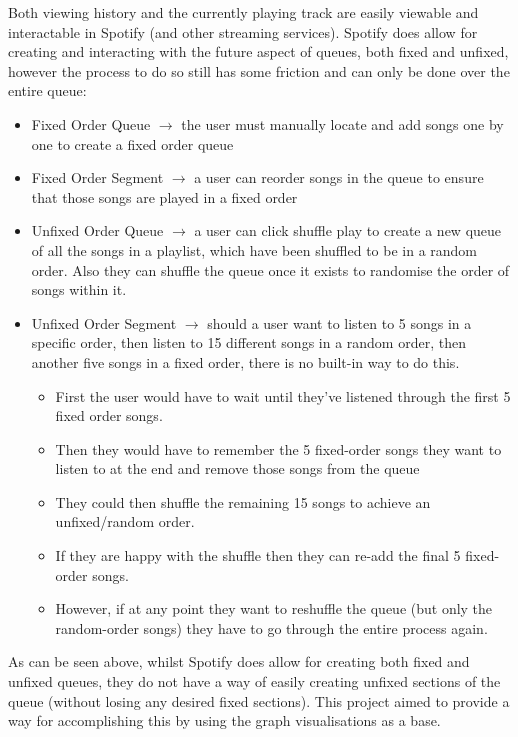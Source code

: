 Both viewing history and the currently playing track are easily viewable and interactable in Spotify (and other streaming services). Spotify does allow for creating and interacting with the future aspect of queues, both fixed and unfixed, however the process to do so still has some friction and can only be done over the entire queue:\begin{itemize}
    \item Fixed Order Queue \(\to\) the user must manually locate and add songs one by one to create a fixed order queue%
    \item Fixed Order Segment \(\to\) a user can reorder songs in the queue to ensure that those songs are played in a fixed order%
    \item Unfixed Order Queue \(\to\) a user can click shuffle play to create a new queue of all the songs in a playlist, which have been shuffled to be in a random order. Also they can shuffle the queue once it exists to randomise the order of songs within it. %
    \item Unfixed Order Segment \(\to\) should a user want to listen to 5 songs in a specific order, then listen to 15 different songs in a random order, then another five songs in a fixed order, there is no built-in way to do this.\begin{itemize}
        \item First the user would have to wait until they've listened through the first 5 fixed order songs.
        \item Then they would have to remember the 5 fixed-order songs they want to listen to at the end and remove those songs from the queue
        \item They could then shuffle the remaining 15 songs to achieve an unfixed/random order.
        \item If they are happy with the shuffle then they can re-add the final 5 fixed-order songs.
        \item However, if at any point they want to reshuffle the queue (but only the random-order songs) they have to go through the entire process again.
    \end{itemize}
\end{itemize}

As can be seen above, whilst Spotify does allow for creating both fixed and unfixed queues, they do not have a way of easily creating unfixed sections of the queue (without losing any desired fixed sections). This project aimed to provide a way for accomplishing this by using the graph visualisations as a base.

